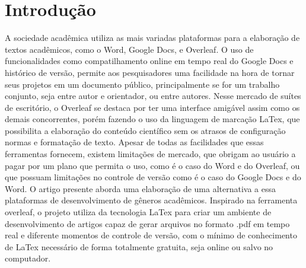 \section{Introdução}

A sociedade acadêmica utiliza as mais variadas plataformas para a elaboração de textos acadêmicos, como o Word, Google Docs, e Overleaf. O uso de funcionalidades como compatilhamento online em tempo real do Google Docs e histórico de versão, permite aos pesquisadores uma facilidade na hora de tornar seus projetos em um documento público, principalmente se for um trabalho conjunto, seja entre autor e orientador, ou entre autores.
Nesse mercado de suítes de escritório, o Overleaf se destaca por ter uma interface amigável assim como os demais concorrentes, porém fazendo o uso da linguagem de marcação LaTex, que possibilita a elaboração do conteúdo científico sem os atrasos de configuração normas e formatação de texto.
Apesar de todas as facilidades que essas ferramentas fornecem, existem limitações de mercado, que obrigam ao usuário a pagar por um plano que permita o uso, como é o caso do Word e do Overleaf, ou que possuam limitações no controle de versão como é o caso do Google Docs e do Word.
O artigo presente aborda uma elaboração de uma alternativa a essa plataformas de desenvolvimento de gêneros acadêmicos. Inspirado na ferramenta overleaf, o projeto utiliza da tecnologia LaTex para criar um ambiente de desenvolvimento de artigos capaz de gerar arquivos no formato .pdf em tempo real e diferente momentos de controle de versão, com o mínimo de conhecimento de LaTex necessário de forma totalmente gratuita, seja online ou salvo no computador.